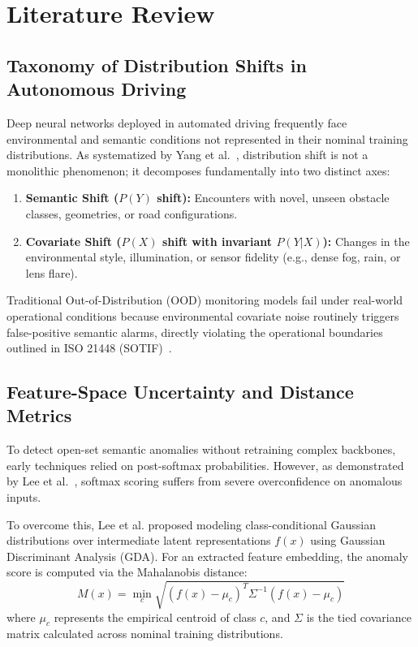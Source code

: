 \chapter{Literature Review}
\label{ch:literature_review}

\section{Taxonomy of Distribution Shifts in Autonomous Driving}
Deep neural networks deployed in automated driving frequently face environmental 
and semantic conditions not represented in their nominal training distributions. 
As systematized by Yang et al.~\cite{yang2021generalized}, distribution shift is not 
a monolithic phenomenon; it decomposes fundamentally into two distinct axes:
\begin{enumerate}
    \item \textbf{Semantic Shift ($P(Y)$ shift):} Encounters with novel, unseen obstacle 
    classes, geometries, or road configurations.
    \item \textbf{Covariate Shift ($P(X)$ shift with invariant $P(Y|X)$):} Changes in the 
    environmental style, illumination, or sensor fidelity (e.g., dense fog, rain, or lens flare).
\end{enumerate}

Traditional Out-of-Distribution (OOD) monitoring models fail under real-world operational 
conditions because environmental covariate noise routinely triggers false-positive semantic 
alarms, directly violating the operational boundaries outlined in ISO 21448 (SOTIF)~\cite{iso21448}.

\section{Feature-Space Uncertainty and Distance Metrics}
To detect open-set semantic anomalies without retraining complex backbones, early techniques 
relied on post-softmax probabilities. However, as demonstrated by Lee et al.~\cite{lee2018simple}, 
softmax scoring suffers from severe overconfidence on anomalous inputs. 

To overcome this, Lee et al. proposed modeling class-conditional Gaussian distributions over 
intermediate latent representations $f(x)$ using Gaussian Discriminant Analysis (GDA). 
For an extracted feature embedding, the anomaly score is computed via the Mahalanobis distance:
\begin{equation}
    M(x) = \min_c \sqrt{(f(x) - \mu_c)^T \Sigma^{-1} (f(x) - \mu_c)}
    \label{eq:mahalanobis}
\end{equation}
where $\mu_c$ represents the empirical centroid of class $c$, and $\Sigma$ is the tied covariance 
matrix calculated across nominal training distributions.

